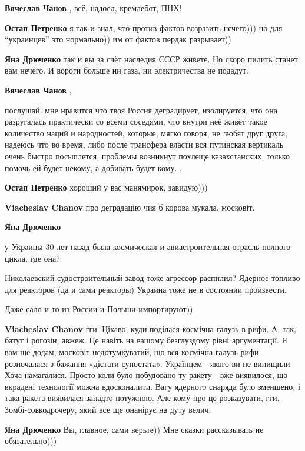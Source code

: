 \begin{itemize}
\begin{itemize}
\textbf{Вячеслав Чанов} , всё, надоел, кремлебот, ПНХ!

\textbf{Остап Петренко} я так и знал, что против фактов возразить нечего))) но для \enquote{украинцев} это нормально)) им от фактов пердак разрывает))

\textbf{Яна Дрюченко} так и вы за счёт наследия СССР живете. Но скоро пилить станет вам нечего. И вороги больше ни газа, ни электричества не подадут.

\textbf{Вячеслав Чанов} , 

послушай, мне нравится что твоя Россия деградирует, изолируется, что она
разругалась практически со всеми соседями, что внутри неё живёт такое
количество наций и народностей, которые, мягко говоря, не любят друг друга,
надеюсь что во время, либо после трансфера власти вся путинская вертикаль очень
быстро посыплется, проблемы возникнут похлеще казахстанских, только помочь ей
будет некому, а добивать будет кому...


\textbf{Остап Петренко} хороший у вас манямирок, завидую)))

\textbf{Viacheslav Chanov} про деградацію чия б корова мукала, московіт.

\textbf{Яна Дрюченко} 

у Украины 30 лет назад была космическая и авиастроительная отрасль полного
цикла, где она?

Николаевский судостроительный завод тоже агрессор распилил? Ядерное топливо для
реакторов (да и сами реакторы) Украина тоже не в состоянии произвести.

Даже сало и то из России и Польши импортируют))


\textbf{Viacheslav Chanov} гги. Цікаво, куди поділася космічна галузь в рифи.
А, так, батут і рогозін, авжеж.
Це навіть на вашому безглуздому рівні аргументації.
Я вам ще додам, московіт недотумкуватий, що вся космічна галузь рифи розпочалася з бажання «дістати супостата». Українцем - якого ви не винищили. Хоча намагалися.
Просто коли було побудовано ту ракету - вже виявилося, що вкрадені технології можна вдосконалити. Вагу ядерного снаряда було зменшено, і така ракета виявилася занадто потужною.
Але кому про це розказувати, гги.
Зомбі-совкодрочеру, який все ще онанірує на дуту велич.

\textbf{Яна Дрюченко}
Вы, главное, сами верьте)) Мне сказки рассказывать не обязательно)))


\end{itemize}
\end{itemize}
